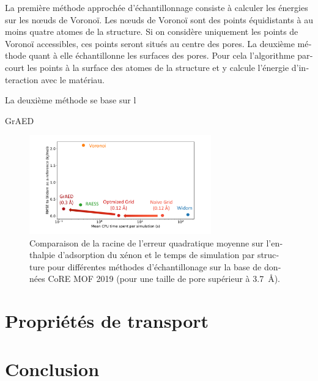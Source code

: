\documentclass[thesis]{subfiles}
\begin{document}
\begin{otherlanguage}{french}
La première méthode approchée d'échantillonnage consiste à calculer les énergies sur les n\oe{}uds de Voronoï. Les n\oe{}uds de Voronoï sont des points équidistants à au moins quatre atomes de la structure. Si on considère uniquement les points de Voronoï accessibles, ces points seront situés au centre des pores. La deuxième méthode quant à elle échantillonne les surfaces des pores. Pour cela l'algorithme parcourt les points à la surface des atomes de la structure et y calcule l'énergie d'interaction avec le matériau. 

La deuxième méthode se base sur l

GrAED

\begin{figure}[ht]
    \centering
      \includegraphics[width=0.7\textwidth]{figures/3-fastsim/Grid_sumup.pdf}
      \caption{Comparaison de la racine de l'erreur quadratique moyenne sur l'enthalpie d'adsorption du xénon et le temps de simulation par structure pour différentes méthodes d'échantillonage  sur la base de données CoRE MOF 2019 (pour une taille de pore supérieur à \SI{3.7}{\angstrom}). }\label{fgr:grid_perfomance}
  \end{figure}


\section*{Propriétés de transport}



\section*{Conclusion}



\vfill
\begin{center}
\end{center}
\vfill\vfill

\end{otherlanguage}

\OnlyInSubfile{\printglobalbibliography}
\end{document}
